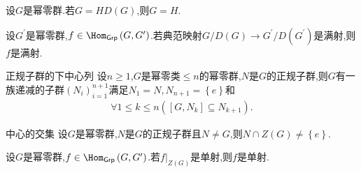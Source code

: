 \begin{corollary}{}{}
	设$G$是幂零群.若$G=HD\left(G\right)$,则$G=H$.
\end{corollary}

\begin{corollary}{}{}
	设$G^{\prime}$是幂零群,$f\in\Hom_{\mathsf{Grp}}\left(G,G^{\prime}\right)$.若典范映射$G/D\left(G\right)\to G^{\prime}/D\left(G^{\prime}\right)$是满射,则$f$是满射.
\end{corollary}

\begin{proposition}{正规子群的下中心列}{}
	设$n\geq 1$,$G$是幂零类$\leq n$的幂零群,$N$是$G$的正规子群,则$G$有一族递减的子群$\left(N_{i}\right)_{i=1}^{n+1}$满足$N_{1}=N,N_{n+1}=\left\{e\right\}$和
	\begin{align*}
		\forall 1\leq k\leq n\left(\left[G,N_{k}\right]\subseteq N_{k+1}\right).
	\end{align*}
\end{proposition}

\begin{corollary}{中心的交集}{}
	设$G$是幂零群,$N$是$G$的正规子群且$N\neq G$,则$N\cap Z\left(G\right)\neq\left\{e\right\}$.
\end{corollary}

\begin{corollary}{}{}
	设$G$是幂零群,$f\in\Hom_{\mathsf{Grp}}\left(G,G^{\prime}\right)$.若$f|_{Z\left(G\right)}$是单射,则$f$是单射.
\end{corollary}




























































